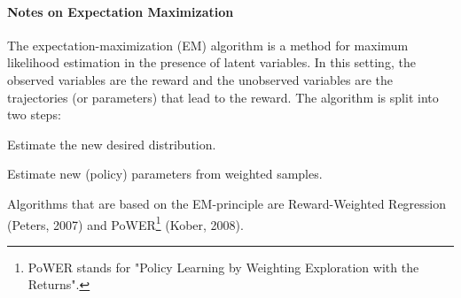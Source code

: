 				\paragraph{Notes on Expectation Maximization}
					The expectation-maximization (EM) algorithm is a method for maximum likelihood estimation in the presence of latent variables. In this setting, the observed variables are the reward and the unobserved variables are the trajectories (or parameters) that lead to the reward. The algorithm is split into two steps:
					\begin{description}[leftmargin=2cm]
						\item[E-Step] Estimate the new desired distribution.
						\item[M-Step] Estimate new (policy) parameters from weighted samples.
					\end{description}
					Algorithms that are based on the EM-principle are Reward-Weighted Regression (Peters, 2007) and PoWER\footnote{PoWER stands for "Policy Learning by Weighting Exploration with the Returns".} (Kober, 2008).

